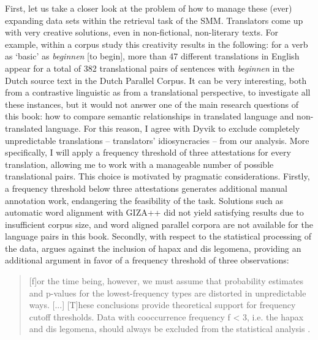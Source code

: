 First, let us take a closer look at the problem of how to manage these (ever) expanding data sets within the retrieval task of the SMM. Translators come up with very creative solutions, even in non-fictional, non-literary texts. For example, within a corpus study this creativity results in the following: for a verb as ‘basic’ as \textit{beginnen} [to begin], more than 47 different translations in English appear for a total of 382 translational pairs of sentences with \textit{beginnen} in the Dutch source text in the Dutch Parallel Corpus. It can be very interesting, both from a contrastive linguistic as from a translational perspective, to investigate all these instances, but it would not answer one of the main research questions of this book: how to compare semantic relationships in translated language and non-translated language. For this reason, I agree with Dyvik to exclude completely unpredictable translations – translators’ idiosyncracies – from our analysis. More specifically, I will apply a frequency threshold of three attestations for every translation, allowing me to work with a manageable number of possible translational pairs. This choice is motivated by pragmatic considerations. Firstly, a frequency threshold below three attestations generates additional manual annotation work, endangering the feasibility of the task. Solutions such as automatic word alignment with GIZA++ did not yield satisfying results due to insufficient corpus size, and word aligned parallel corpora are not available for the language pairs in this book. Secondly, with respect to the statistical processing of the data, \citet[133]{evert_statistics_2004} argues against the inclusion of hapax and dis legomena, providing an additional argument in favor of a frequency threshold of three observations:

\begin{quote}
[f]or the time being, however, we must assume that probability estimates and p-values for the lowest-frequency types are distorted in unpredictable ways. [...] [T]hese conclusions provide theoretical support for frequency cutoff thresholds. Data with cooccurrence frequency f < 3, i.e. the hapax and dis legomena, should always be excluded from the statistical analysis \citep[133]{evert_statistics_2004}.
\end{quote}

